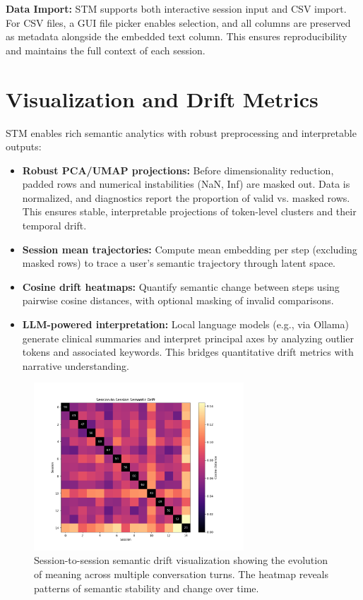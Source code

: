 \documentclass[11pt]{article}
\begin{document}
\vspace{0.5em}
\textbf{Data Import:}
STM supports both interactive session input and CSV import. For CSV files, a GUI file picker enables selection, and all columns are preserved as metadata alongside the embedded text column. This ensures reproducibility and maintains the full context of each session.

\section{Visualization and Drift Metrics}
STM enables rich semantic analytics with robust preprocessing and interpretable outputs:

\begin{itemize}[leftmargin=2em]
    \item \textbf{Robust PCA/UMAP projections:} Before dimensionality reduction, padded rows and numerical instabilities (NaN, Inf) are masked out. Data is normalized, and diagnostics report the proportion of valid vs. masked rows. This ensures stable, interpretable projections of token-level clusters and their temporal drift.
    
    \item \textbf{Session mean trajectories:} Compute mean embedding per step (excluding masked rows) to trace a user's semantic trajectory through latent space.
    
    \item \textbf{Cosine drift heatmaps:} Quantify semantic change between steps using pairwise cosine distances, with optional masking of invalid comparisons.
    
    \item \textbf{LLM-powered interpretation:} Local language models (e.g., via Ollama) generate clinical summaries and interpret principal axes by analyzing outlier tokens and associated keywords. This bridges quantitative drift metrics with narrative understanding.
\end{itemize}

\begin{figure}[h]
    \centering
    \includegraphics[width=0.7\textwidth]{demo_session-to-session_semantic_drift.png}
    \caption{Session-to-session semantic drift visualization showing the evolution of meaning across multiple conversation turns. The heatmap reveals patterns of semantic stability and change over time.}
    \label{fig:drift}
\end{figure}
\end{document}
